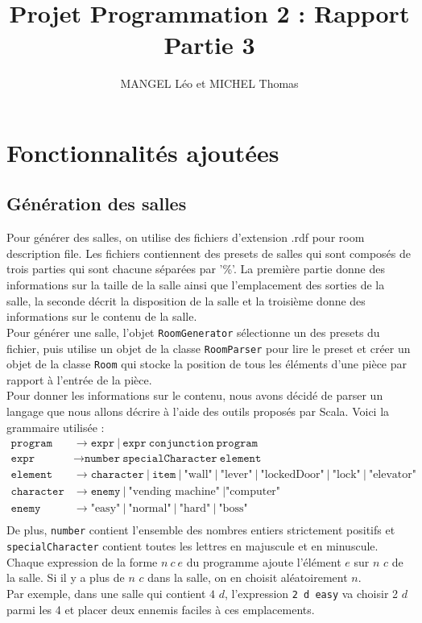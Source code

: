 \documentclass[10pt,a4paper]{article}
\title{Projet Programmation 2 : Rapport Partie 3}
\author{MANGEL Léo et MICHEL Thomas}
\date{}
\begin{document}
\maketitle

\section{Fonctionnalités ajoutées}

\subsection{Génération des salles}

Pour générer des salles, on utilise des fichiers d'extension .rdf pour room description file. Les fichiers contiennent des presets de salles qui sont composés de trois parties qui sont chacune séparées par '\%'. La première partie donne des informations sur la taille de la salle ainsi que l'emplacement des sorties de la salle, la seconde décrit la disposition de la salle et la troisième donne des informations sur le contenu de la salle.\\
Pour générer une salle, l'objet \texttt{RoomGenerator} sélectionne un des presets du fichier, puis utilise un objet de la classe \texttt{RoomParser} pour lire le preset et créer un objet de la classe \texttt{Room} qui stocke la position de tous les éléments d'une pièce par rapport à l'entrée de la pièce.\\
Pour donner les informations sur le contenu, nous avons décidé de parser un langage que nous allons décrire à l'aide des outils proposés par Scala. Voici la grammaire utilisée :\\
\begin{align*}
	\texttt{program} &\to \texttt{expr}\ |\ \texttt{expr}\ \texttt{conjunction}\ \texttt{program}\\
	\texttt{expr} &\to \texttt{number}\ \texttt{specialCharacter}\ \texttt{element}\\
	\texttt{element} &\to \texttt{character}\ |\ \texttt{item}\ |\ \mbox{"wall"}\ |\ \mbox{"lever"}\ |\ \mbox{"lockedDoor"}\ |\ \mbox{"lock"}\ |\ \mbox{"elevator"}\\
	\texttt{character} &\to \texttt{enemy}\ |\ \mbox{"vending machine"}\ | \mbox{"computer"}\\
	\texttt{enemy} &\to \mbox{"easy"}\ |\ \mbox{"normal"}\ |\ \mbox{"hard"}\ |\ \mbox{"boss"}\\
\end{align*}
De plus, \texttt{number} contient l'ensemble des nombres entiers strictement positifs et \texttt{specialCharacter} contient toutes les lettres en majuscule et en minuscule.\\
Chaque expression de la forme $n\ c\ e$ du programme ajoute l'élément $e$ sur $n$ $c$ de la salle. Si il y a plus de $n$ $c$ dans la salle, on en choisit aléatoirement $n$.\\
Par exemple, dans une salle qui contient $4$ $d$, l'expression \texttt{2 d easy} va choisir 2 $d$ parmi les 4 et placer deux ennemis faciles à ces emplacements.\\
\end{document}
